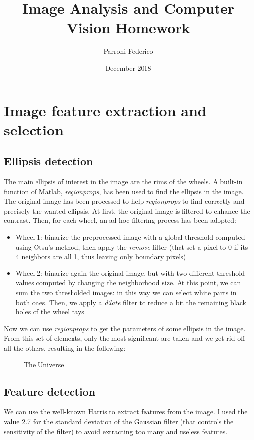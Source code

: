 \documentclass{article}
\title{Image Analysis and Computer Vision Homework}
\author{Parroni Federico}
\date{December 2018}
\begin{document}
\maketitle

\section{Image feature extraction and selection}

\subsection{Ellipsis detection}
The main ellipsis of interest in the image are the rims of the wheels. A built-in function of Matlab, \textit{regionprops}, has been used to find the ellipsis in the image.
The original image has been processed to help \textit{regionprops} to find correctly and precisely the wanted ellipsis.
At first, the original image is filtered to enhance the contrast. Then, for each wheel, an ad-hoc filtering process has been adopted:
\begin{itemize}
    \item Wheel 1: binarize the preprocessed image with a global threshold computed using Otsu's method, then apply the \textit{remove} filter (that set a pixel to 0 if its 4 neighbors are all 1, thus leaving only boundary pixels)
    \item Wheel 2: binarize again the original image, but with two different threshold values computed by changing the neighborhood size. At this point, we can sum the two thresholded images: in this way we can select white parts in both ones. Then, we apply a \textit{dilate} filter to reduce a bit the remaining black holes of the wheel rays
\end{itemize}
Now we can use \textit{regionprops} to get the parameters of some ellipsis in the image. From this set of elements, only the most significant are taken and we get rid off all the others, resulting in the following:
\begin{figure}[h!]
\centering
\caption{The Universe}
\label{fig:universe}
\end{figure}


\subsection{Feature detection}
We can use the well-known Harris to extract features from the image. I used the value 2.7 for the standard deviation of the Gaussian filter (that controls the sensitivity of the filter) to avoid extracting too many and useless features.
\end{document}
